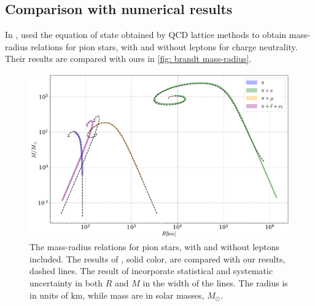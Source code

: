 \subsection{Comparison with numerical results}

In \autocite{brandtNewClassCompact2018}, \citeauthor{brandtNewClassCompact2018} used the equation of state obtained by QCD lattice methods to obtain mass-radius relations for pion stars, with and without leptons for charge neutrality.
Their results are compared with ours in  \autoref{fig: brandt mass-radius}.


\begin{figure}[!htb]
    \centering
    \includegraphics[width=\textwidth]{../scripts/figurer/pion_star/mass_radius_brandt_all.pdf}
    \caption{
        The mass-radius relations for pion stars, with and without leptons included.
        The results of \citeauthor{brandtNewClassCompact2018}, solid color, are compared with our results, dashed lines.
        The result of \citeauthor{brandtNewClassCompact2018} incorporate statistical and systematic uncertainty in both $R$ and $M$ in the width of the lines.
        The radius is in units of $\text{km}$, while mass are in solar masses, $M_\odot$.
    }
    \label{fig: brandt mass-radius}
\end{figure}

